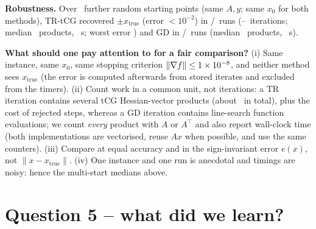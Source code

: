 \documentclass[10pt,a4paper]{article}
\newcommand{\xtrue}{x_{\mathrm{true}}}
\begin{document}
\textbf{Robustness.} Over \ParamNStarts\ further random starting points (same $A,y$; same $x_0$ for both methods), TR-tCG recovered $\pm\xtrue$ (error $<10^{-2}$) in \MSTRSuccess/\ParamNStarts\ runs
(\MSTRItersMin--\MSTRItersMax\ iterations; median \MSTRMatvecsMedian\ products, \MSTRTimeMedian\ s; worst error \MSErrMax) and GD in \MSGDSuccess/\ParamNStarts\ runs
(median \MSGDMatvecsMedian\ products, \MSGDTimeMedian\ s).

\textbf{What should one pay attention to for a fair comparison?}
(i) Same instance, same $x_0$, same stopping criterion $\|\nabla f\|\le1\times10^{-8}$, and neither method sees $\xtrue$ (the error is computed afterwards from stored iterates and excluded from the timers).
(ii) Count work in a common unit, not iterations: a TR iteration contains several tCG Hessian-vector products (about \TRTotalTCG\ in total), plus the cost of rejected steps, whereas a GD iteration contains
line-search function evaluations; we count \emph{every} product with $A$ or $A^\top$ and also report wall-clock time (both implementations are vectorised, reuse $Ax$ when possible, and use the same counters).
(iii) Compare at equal accuracy and in the sign-invariant error $e(x)$, not $\|x-\xtrue\|$.
(iv) One instance and one run is anecdotal and timings are noisy: hence the multi-start medians above.

\newpage

\section*{Question 5 -- what did we learn?}
\end{document}
